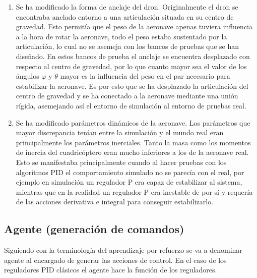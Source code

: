 \begin{enumerate}
	\item Se ha modificado la forma de anclaje del dron. Originalmente el dron se encontraba anclado entorno a una articulación situada en su centro de gravedad. Esto permitía que el peso de la aeronave apenas tuviera influencia a la hora de rotar la aeronave, todo el peso estaba sustentado por la articulación, lo cual no se asemeja con los bancos de pruebas que se han diseñado. En estos bancos de prueba el anclaje se encuentra desplazado con respecto al centro de gravedad, por lo que cuanto mayor sea el valor de los ángulos $\varphi$ y $\theta$ mayor es la influencia del peso en el par necesario para estabilizar la aeronave. Es por esto que se ha desplazado la articulación del centro de gravedad y se ha conectado a la aeronave mediante una unión rígida, asemejando así el entorno de simulación al entorno de pruebas real.
	\item Se ha modificado parámetros dinámicos de la aeronave. Los parámetros que mayor discrepancia tenían entre la simulación y el mundo real eran principalmente los parámetros inerciales. Tanto la masa como los momentos de inercia del cuadricóptero eran mucho inferiores a los de la aeronave real. Esto se manifestaba principalmente cuando al hacer pruebas con los algoritmos PID el comportamiento simulado no se parecía con el real, por ejemplo en simulación un regulador P era capaz de estabilizar al sistema, mientras que en la realidad un regulador P era inestable de por sí y requería de las acciones derivativa e integral para conseguir estabilizarlo.
\end{enumerate}



 



\subsection{Agente (generación de comandos)}
Siguiendo con la terminología del aprendizaje por refuerzo se va a denominar agente al encargado de generar las acciones de control. En el caso de los reguladores PID clásicos el agente hace la función de los reguladores.




